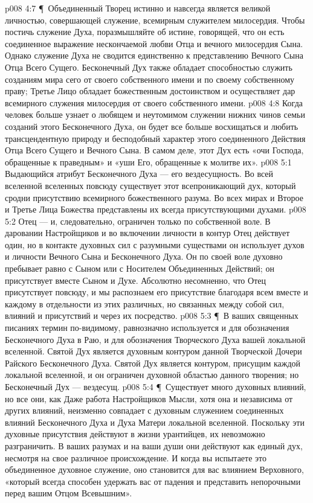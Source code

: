 \vs p008 4:7 \P\ Объединенный Творец истинно и навсегда является великой личностью, совершающей служение, всемирным служителем милосердия. Чтобы постичь служение Духа, поразмышляйте об истине, говорящей, что он есть соединенное выражение нескончаемой любви Отца и вечного милосердия Сына. Однако служение Духа не сводится единственно к представлению Вечного Сына Отца Всего Сущего. Бесконечный Дух также обладает способностью служить созданиям мира сего от своего собственного имени и по своему собственному праву; Третье Лицо обладает божественным достоинством и осуществляет дар всемирного служения милосердия от своего собственного имени.
\vs p008 4:8 Когда человек больше узнает о любящем и неутомимом служении нижних чинов семьи созданий этого Бесконечного Духа, он будет все больше восхищаться и любить трансцендентную природу и бесподобный характер этого соединенного Действия Отца Всего Сущего и Вечного Сына. В самом деле, этот Дух есть «очи Господа, обращенные к праведным» и «уши Его, обращенные к молитве их».
\vs p008 5:1 Выдающийся атрибут Бесконечного Духа --- его вездесущность. Во всей вселенной вселенных повсюду существует этот всепроникающий дух, который сродни присутствию всемирного божественного разума. Во всех мирах и Второе и Третье Лица Божества представлены их всегда присутствующими духами.
\vs p008 5:2 Отец ---  и, следовательно, ограничен только по собственной воле. В даровании Настройщиков и во включении личности в контур Отец действует один, но в контакте духовных сил с разумными существами он использует духов и личности Вечного Сына и Бесконечного Духа. Он по своей воле духовно пребывает равно с Сыном или с Носителем Объединенных Действий; он присутствует вместе  Сыном и  Духе. Абсолютно несомненно, что Отец присутствует повсюду, и мы распознаем его присутствие благодаря всем вместе и каждому в отдельности из этих различных, но связанных между собой сил, влияний и присутствий и через их посредство.
\vs p008 5:3 \P\ В ваших священных писаниях термин  по\hyp{}видимому, равнозначно используется и для обозначения Бесконечного Духа в Раю, и для обозначения Творческого Духа вашей локальной вселенной. Святой Дух является духовным контуром данной Творческой Дочери Райского Бесконечного Духа. Святой Дух является контуром, присущим каждой локальной вселенной, и он ограничен духовной областью данного творения; но Бесконечный Дух --- вездесущ.
\vs p008 5:4 \P\ Существует много духовных влияний, но все они, как  Даже работа Настройщиков Мысли, хотя она и независима от других влияний, неизменно совпадает с духовным служением соединенных влияний Бесконечного Духа и Духа Матери локальной вселенной. Поскольку эти духовные присутствия действуют в жизни урантийцев, их невозможно разграничить. В ваших разумах и на ваши души они действуют как единый дух, несмотря на свое различное происхождение. И когда вы испытаете это объединенное духовное служение, оно становится для вас влиянием Верховного, «который всегда способен удержать вас от падения и представить непорочными перед вашим Отцом Всевышним».
